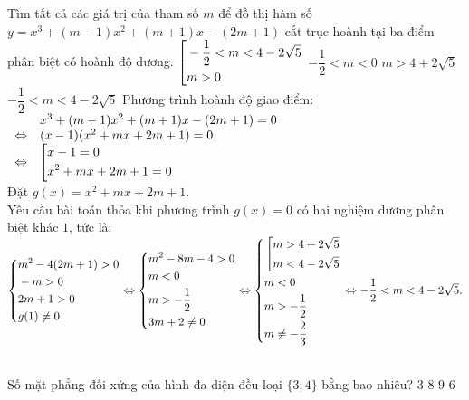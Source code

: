 \begin{ex}%
Tìm tất cả các giá trị của tham số $m$ để đồ thị hàm số $y = x^3 + (m-1)x^2 + (m+1)x - (2m+1)$ cắt trục hoành tại ba điểm phân biệt có hoành độ dương.
 \choice
  { $\left[\begin{aligned}& -\dfrac{1}{2} < m < 4-2\sqrt{5} \\& m>0\end{aligned}\right.$}
  { $-\dfrac{1}{2} < m <0$}
  { $m > 4+2\sqrt{5}$}
  { \True $-\dfrac{1}{2} < m < 4-2\sqrt{5}$}
 \loigiai
  {
  Phương trình hoành độ giao điểm:\\
  $\begin{array}{ll}
  				  & x^3 + (m-1)x^2 + (m+1)x - (2m+1) =0\\
  \Leftrightarrow & (x-1)(x^2+mx+2m+1)=0\\
  \Leftrightarrow & \left[\begin{aligned}& x-1 = 0 \\& x^2+mx+2m+1 =0\end{aligned}\right.
  \end{array}$\\
  Đặt $g(x) = x^2+mx+2m+1$.\\
  Yêu cầu bài toán thỏa khi phương trình $g(x) = 0$ có hai nghiệm dương phân biệt khác $1$, tức là:\\
  $\left\{\begin{aligned}& m^2-4(2m+1) >0 \\& -m >0 \\& 2m+1 >0 \\& g(1) \ne 0\end{aligned}\right. \Leftrightarrow \left\{\begin{aligned}& m^2 - 8m -4 >0 \\& m <0 \\& m > -\dfrac{1}{2} \\& 3m + 2 \ne 0\end{aligned}\right. \Leftrightarrow \left\{\begin{aligned}& \left[\begin{aligned}&m > 4 + 2\sqrt{5} \\& m < 4 - 2\sqrt{5}\end{aligned}\right. \\& m<0 \\& m> -\dfrac{1}{2} \\& m \ne -\dfrac{2}{3}\end{aligned}\right. \Leftrightarrow -\dfrac{1}{2} < m < 4-2\sqrt{5}.$
  \
  }
\end{ex}


\begin{ex}%
Số mặt phẳng đối xứng của hình đa diện đều loại $\{3;4\}$ bằng bao nhiêu?
 \choice
  { $3$}
  { $8$}
  { \True $9$}
  { $6$}
  {
  
  }
\end{ex}


